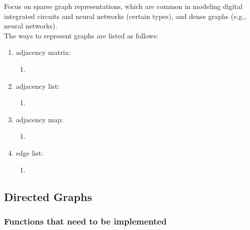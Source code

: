 Focus on sparse graph representations, which are common in modeling digital integrated circuits and neural networks (certain types), and dense graphs (e.g., neural networks). \\

The ways to represent graphs are listed as follows: \vspace{-0.3cm}
\begin{enumerate} \itemsep -4pt
\item adjacency matrix: \vspace{-0.3cm}
	\begin{enumerate} \itemsep -2pt
	\item 
	\end{enumerate}
\item adjacency list: \vspace{-0.3cm}
	\begin{enumerate} \itemsep -2pt
	\item 
	\end{enumerate}
\item adjacency map: \vspace{-0.3cm}
	\begin{enumerate} \itemsep -2pt
	\item 
	\end{enumerate}
\item edge list: \vspace{-0.3cm}
	\begin{enumerate} \itemsep -2pt
	\item 
	\end{enumerate}
\end{enumerate}









\subsection{Directed Graphs}
\label{ssec:DirectedGraphs}



\subsubsection{Functions that need to be implemented}
\label{sssec:FunctionsThatNeedToBeImplemented}





